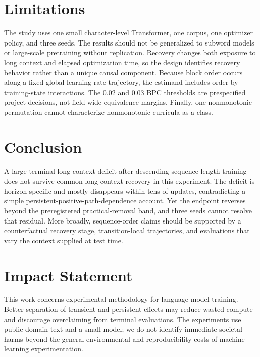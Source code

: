 \documentclass{article}
\begin{document}
\section{Limitations}

The study uses one small character-level Transformer, one corpus, one optimizer policy, and three seeds. The results should not be generalized to subword models or large-scale pretraining without replication. Recovery changes both exposure to long context and elapsed optimization time, so the design identifies recovery behavior rather than a unique causal component. Because block order occurs along a fixed global learning-rate trajectory, the estimand includes order-by-training-state interactions. The $0.02$ and $0.03$ BPC thresholds are prespecified project decisions, not field-wide equivalence margins. Finally, one nonmonotonic permutation cannot characterize nonmonotonic curricula as a class.

\section{Conclusion}

A large terminal long-context deficit after descending sequence-length training does not survive common long-context recovery in this experiment. The deficit is horizon-specific and mostly disappears within tens of updates, contradicting a simple persistent-positive-path-dependence account. Yet the endpoint reverses beyond the preregistered practical-removal band, and three seeds cannot resolve that residual. More broadly, sequence-order claims should be supported by a counterfactual recovery stage, transition-local trajectories, and evaluations that vary the context supplied at test time.

\section*{Impact Statement}

This work concerns experimental methodology for language-model training. Better separation of transient and persistent effects may reduce wasted compute and discourage overclaiming from terminal evaluations. The experiments use public-domain text and a small model; we do not identify immediate societal harms beyond the general environmental and reproducibility costs of machine-learning experimentation.



\end{document}
